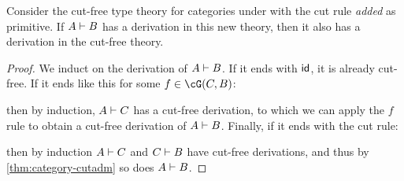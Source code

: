\begin{thm}\label{thm:category-cutelim}
  Consider the cut-free type theory for categories under \cG with the cut rule \emph{added} as primitive.
  If $A\types B$ has a derivation in this new theory, then it also has a derivation in the cut-free theory.
\end{thm}
\begin{proof}
  We induct on the derivation of $A\types B$.
  If it ends with $\idfunc$, it is already cut-free.
  If it ends like this for some $f\in\cG(C,B)$:
  \begin{mathpar}
  \end{mathpar}
  then by induction, $A\types C$ has a cut-free derivation, to which we can apply the $f$ rule to obtain a cut-free derivation of $A\types B$.
  Finally, if it ends with the cut rule:
  \begin{mathpar}
  \end{mathpar}
  then by induction $A\types C$ and $C\types B$ have cut-free derivations, and thus by \cref{thm:category-cutadm} so does $A\types B$.
\end{proof}

